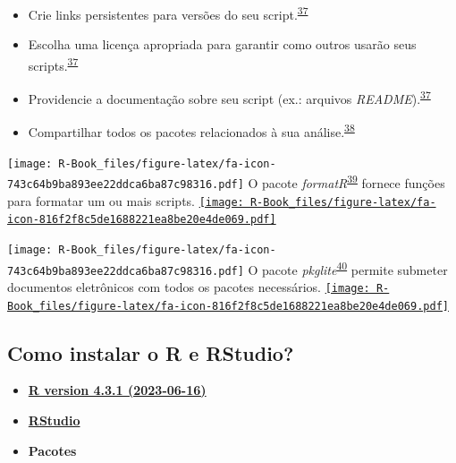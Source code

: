 \documentclass[
]{book}
\begin{document}
\begin{itemize}
\item
  Crie links persistentes para versões do seu script.\textsuperscript{\protect\hyperlink{ref-Eglen2017}{37}}
\item
  Escolha uma licença apropriada para garantir como outros usarão seus scripts.\textsuperscript{\protect\hyperlink{ref-Eglen2017}{37}}
\item
  Providencie a documentação sobre seu script (ex.: arquivos \emph{README}).\textsuperscript{\protect\hyperlink{ref-Eglen2017}{37}}
\item
  Compartilhar todos os pacotes relacionados à sua análise.\textsuperscript{\protect\hyperlink{ref-Zhao2023}{38}}
\end{itemize}

\texttt{[image: R-Book\_files/figure-latex/fa-icon-743c64b9ba893ee22ddca6ba87c98316.pdf]} O pacote \emph{formatR}\textsuperscript{\protect\hyperlink{ref-formatR}{39}} fornece funções para formatar um ou mais scripts. \href{https://cran.r-project.org/web/packages/formatR/index.html}{\texttt{[image: R-Book\_files/figure-latex/fa-icon-816f2f8c5de1688221ea8be20e4de069.pdf]}}

\texttt{[image: R-Book\_files/figure-latex/fa-icon-743c64b9ba893ee22ddca6ba87c98316.pdf]} O pacote \emph{pkglite}\textsuperscript{\protect\hyperlink{ref-pkglite}{40}} permite submeter documentos eletrônicos com todos os pacotes necessários. \href{https://cran.rstudio.com/web/packages/pkglite/index.html}{\texttt{[image: R-Book\_files/figure-latex/fa-icon-816f2f8c5de1688221ea8be20e4de069.pdf]}}

\hypertarget{como-instalar-o-r-e-rstudio}{%
\subsection{Como instalar o R e RStudio?}\label{como-instalar-o-r-e-rstudio}}

\begin{itemize}
\item
  \href{https://cran.rstudio.com/}{\textbf{R version 4.3.1 (2023-06-16)}}
\item
  \href{https://posit.co/downloads/}{\textbf{RStudio}}
\item
  \textbf{Pacotes}
\end{itemize}
\end{document}
